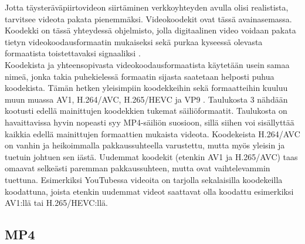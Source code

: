 \documentclass[finnish, 12pt, a4paper, elec, utf8, a-1b, online]{aaltothesis}
\begin{document}
\noindent Jotta täysteräväpiirtovideon siirtäminen verkkoyhteyden avulla olisi realistista, tarvitsee videota pakata pienemmäksi. Videokoodekit ovat tässä avainasemassa. Koodekki on tässä yhteydessä ohjelmisto, jolla digitaalinen video voidaan pakata tietyn videokoodausformaatin mukaiseksi sekä purkaa kyseessä olevasta formaatista toistettavaksi signaaliksi \cite{Codec}. \\

\noindent Koodekista ja yhteensopivasta videokoodausformaatista käytetään usein samaa nimeä, jonka takia puhekielessä formaatin sijasta saatetaan helposti puhua koodekista. Tämän hetken yleisimpiin koodekkeihin sekä formaatteihin kuuluu muun muassa AV1, H.264/AVC, H.265/HEVC ja VP9 \cite{Codec guide}. Taulukosta 3 nähdään kootusti edellä mainittujen koodekkien tukemat säiliöformaatit. Taulukosta on havaittavissa hyvin nopeasti syy MP4-säiliön suosioon, sillä siihen voi sisällyttää kaikkia edellä mainittujen formaattien mukaista videota. Koodekeista H.264/AVC on vanhin ja heikoimmalla pakkaussuhteella varustettu, mutta myös yleisin ja tuetuin johtuen sen iästä. Uudemmat koodekit (etenkin AV1 ja H.265/AVC) taas omaavat selkeästi paremman pakkaussuhteen, mutta ovat vaihtelevammin tuettuna. Esimerkiksi YouTubessa videoita on tarjolla sekalaisilla koodekeilla koodattuna, joista etenkin uudemmat videot saattavat olla koodattu esimerkiksi AV1:llä tai H.265/HEVC:llä.

\begin{table}[htb]
  \caption{Suosittuja videokoodekkeja ja niiden säiliöitä. \cite{Codec guide} \label{taulukko3}}
  \centering
\end{table}

\subsection*{MP4}
\end{document}
